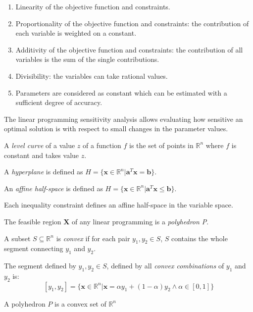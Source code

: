 \documentclass[12pt, a4paper]{report}
\begin{document}
    \begin{enumerate}
        \item Linearity of the objective function and constraints. 
        \item Proportionality of the objective function and constraints: the contribution of each variable is weighted on a constant. 
        \item Additivity of the objective function and constraints: the contribution of all variables is the sum of the single 
            contributions.
        \item Divisibility: the variables can take rational values. 
        \item Parameters are considered as constant which can be estimated with a sufficient degree of accuracy. 
    \end{enumerate}
    The linear programming sensitivity analysis allows evaluating how sensitive an optimal solution is with respect to small changes in 
    the parameter values. 
    \begin{definition}
        A \emph{level curve} of a value $z$ of a function $f$ is the set of points in $\mathbb{R}^n$ where $f$ is constant and takes value $z$.

        A \emph{hyperplane} is defined as $H=\{\boldsymbol{x} \in \mathbb{R}^n|\boldsymbol{a}^T\boldsymbol{x}=\boldsymbol{b}\}$. 

        An \emph{affine half-space} is defined as $H=\{\boldsymbol{x} \in \mathbb{R}^n|\boldsymbol{a}^T\boldsymbol{x} \leq \boldsymbol{b}\}$. 
    \end{definition}
    Each inequality constraint defines an affine half-space in the variable space. 
    \begin{definition}
        The feasible region $\boldsymbol{X}$ of any linear programming is a \emph{polyhedron P}.

        A subset $S \subseteq \mathbb{R}^n$ is \emph{convex} if for each pair $y_1,y_2 \in S$, $S$ contains the whole segment connecting $y_1$ 
        and $y_2$. 

        The segment defined by $y_1,y_2 \in S$, defined by all \emph{convex combinations} of $y_1$ and $y_2$ is: 
        \[[y_1,y_2]=\{\boldsymbol{x} \in \mathbb{R}^n|\boldsymbol{x}=\alpha y_1+(1-\alpha)y_2 \land \alpha \in [0,1]\} \]
    \end{definition}
    \begin{example}[Property]
        A polyhedron $P$ is a convex set of $\mathbb{R}^n$
    \end{example}
\end{document}
